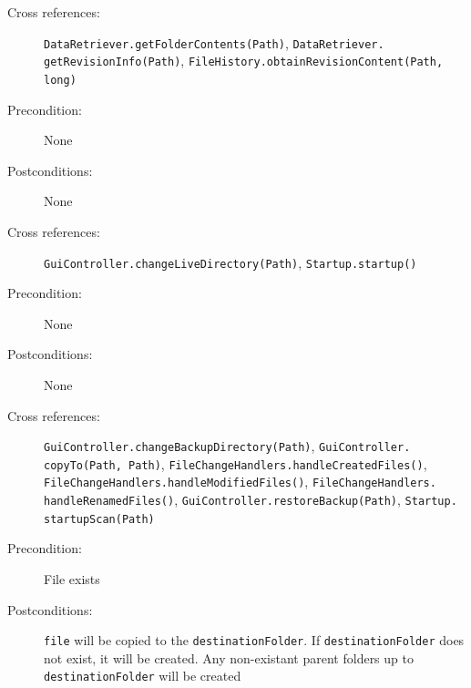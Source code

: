 \documentclass[12pt,a4paper]{article}
\begin{document}
\vspace{0.75cm}

\begin{description}
\item[Cross references:] \texttt{DataRetriever.getFolderContents(Path)}, \texttt{DataRetriever.} \\\texttt{getRevisionInfo(Path)}, \texttt{FileHistory.obtainRevisionContent(Path, long)}
\item[Precondition:] None
\item[Postconditions:] None
\end{description}

\vspace{0.75cm}

\begin{description}
\item[Cross references:] \texttt{GuiController.changeLiveDirectory(Path)}, \texttt{Startup.startup()}
\item[Precondition:] None
\item[Postconditions:] None
\end{description}

\vspace{0.75cm}

\begin{description}
\item[Cross references:] \texttt{GuiController.changeBackupDirectory(Path)}, \texttt{GuiController.} \texttt{copyTo(Path, Path)}, \texttt{FileChangeHandlers.handleCreatedFiles()}, \\ \texttt{FileChangeHandlers.handleModifiedFiles()}, \texttt{FileChangeHandlers.} \\ \texttt{handleRenamedFiles()}, \texttt{GuiController.restoreBackup(Path)}, \texttt{Startup.} \\ \texttt{startupScan(Path)}
\item[Precondition:] File exists
\item[Postconditions:] \texttt{file} will be copied to the \texttt{destinationFolder}. If \texttt{destinationFolder} does not exist, it will be created. Any non-existant parent folders up to \texttt{destinationFolder} will be created
\end{description}

\vspace{0.75cm}
\end{document}
